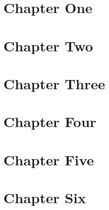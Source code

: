 \documentclass[12pt]{scrbook}
\begin{document}
\chapter{Chapter One}
\lipsum

\chapter{Chapter Two}
\lipsum

\chapter{Chapter Three}
\lipsum

\chapter{Chapter Four}
\lipsum

\chapter{Chapter Five}
\lipsum

\chapter{Chapter Six}
\lipsum
\end{document}
